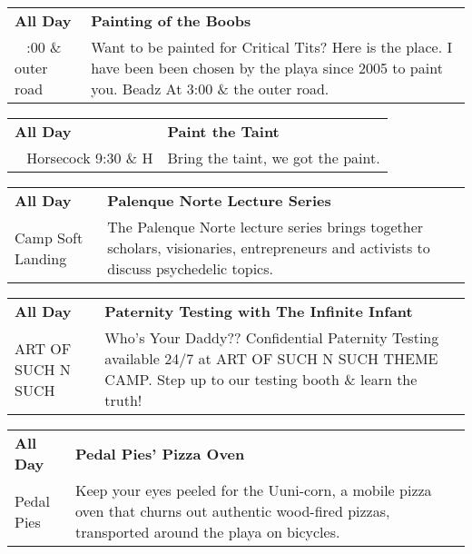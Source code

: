 \begin{tabular}{ p{1in} p{2.2in} }
    \textbf{All Day} & \textbf{Painting of the Boobs} \\
    ~ \newline 3:00 \& outer road & Want to be painted for Critical Tits? Here is the place. I have been been chosen by the playa since 2005 to paint you. Beadz At 3:00 \& the outer road. \\
    \hline 
\end{tabular}
    
\begin{tabular}{ p{1in} p{2.2in} }
    \textbf{All Day} & \textbf{Paint the Taint} \\
    ~ \newline Horsecock 9:30 \& H & Bring the taint, we got the paint. \\
    \hline 
\end{tabular}
    
\begin{tabular}{ p{1in} p{2.2in} }
    \textbf{All Day} & \textbf{Palenque Norte Lecture Series} \\
    Camp Soft Landing \newline  & The Palenque Norte lecture series brings together scholars, visionaries, entrepreneurs and activists to discuss psychedelic topics. \\
    \hline 
\end{tabular}
    
\begin{tabular}{ p{1in} p{2.2in} }
    \textbf{All Day} & \textbf{Paternity Testing with The Infinite Infant} \\
    ART OF SUCH N SUCH \newline  & Who's Your Daddy?? Confidential Paternity Testing available 24/7 at ART OF SUCH N SUCH THEME CAMP. Step up to our testing booth \& learn the truth! \\
    \hline 
\end{tabular}
    
\begin{tabular}{ p{1in} p{2.2in} }
    \textbf{All Day} & \textbf{Pedal Pies' Pizza Oven} \\
    Pedal Pies \newline  & Keep your eyes peeled for the Uuni-corn, a mobile pizza oven that churns out authentic wood-fired pizzas, transported around the playa on bicycles. \\
    \hline 
\end{tabular}
    
